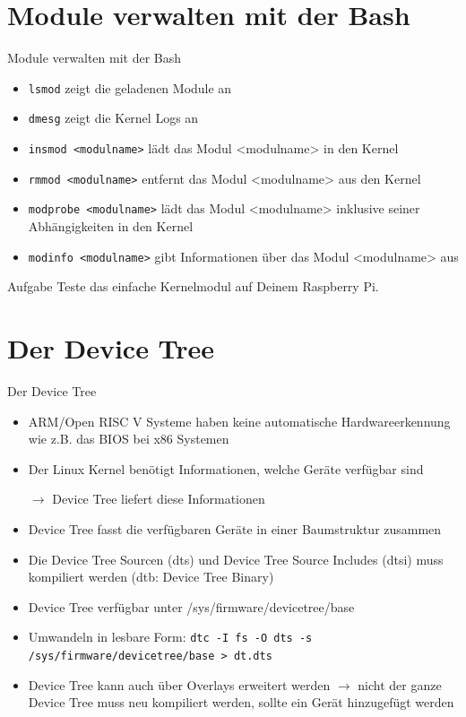 \documentclass[aspectratio=169]{beamer}
\begin{document}
\section{Module verwalten mit der Bash}
\begin{frame}[fragile]{Module verwalten mit der Bash}
	\begin{itemize}
		\item \lstinline|lsmod| zeigt die geladenen Module an
		\item \lstinline|dmesg| zeigt die Kernel Logs an
		\item \lstinline|insmod <modulname>| lädt das Modul <modulname> in den Kernel
		\item \lstinline|rmmod <modulname>|  entfernt das Modul <modulname> aus den Kernel
		\item \lstinline|modprobe <modulname>|  lädt das Modul <modulname> inklusive seiner Abhängigkeiten in den Kernel
		\item \lstinline|modinfo <modulname>|  gibt Informationen über das Modul <modulname> aus
	\end{itemize}
\end{frame}

\begin{frame}{Aufgabe}
	Teste das einfache Kernelmodul auf Deinem Raspberry Pi.
\end{frame}

\section{Der Device Tree}
\begin{frame}[fragile]{Der Device Tree}
	\begin{itemize}
		\item ARM/Open RISC V Systeme haben keine automatische Hardwareerkennung wie z.B. das BIOS bei x86 Systemen
		\item Der Linux Kernel benötigt Informationen, welche Geräte verfügbar sind
		\item[$\rightarrow$] Device Tree liefert diese Informationen
		\item Device Tree fasst die verfügbaren Geräte in einer Baumstruktur zusammen
		\item Die Device Tree Sourcen (dts) und Device Tree Source Includes (dtsi)  muss kompiliert werden (dtb: Device Tree Binary)
		\item Device Tree verfügbar unter /sys/firmware/devicetree/base
		\item Umwandeln in lesbare Form: \lstinline|dtc -I fs -O dts -s /sys/firmware/devicetree/base > dt.dts|
		\item Device Tree kann auch über Overlays erweitert werden $\rightarrow$ nicht der ganze Device Tree muss neu kompiliert werden, sollte ein Gerät hinzugefügt werden
	\end{itemize}
\end{frame}
\end{document}
